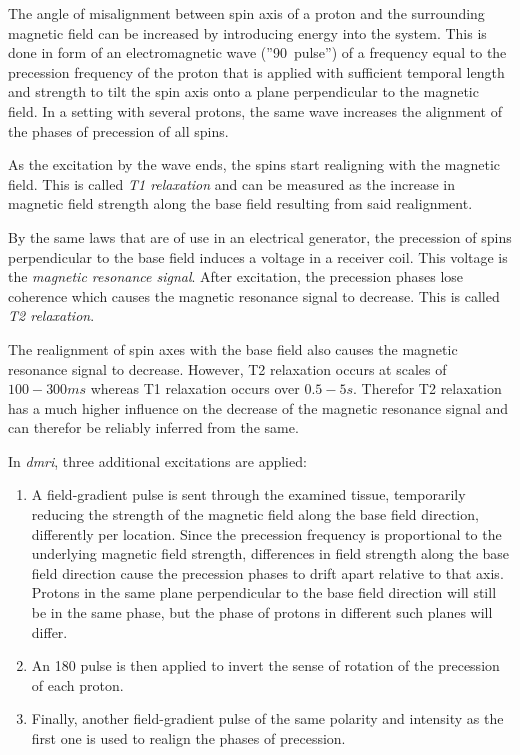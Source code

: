 \documentclass[plainreport]{cgvpub}
\begin{document}
	The angle of misalignment between spin axis of a proton and the surrounding magnetic field can be increased by introducing energy into the system. This is done in form of an electromagnetic wave \mbox{(''90\textdegree{} pulse'')} of a frequency equal to the precession frequency of the proton that is applied with sufficient temporal length and strength to tilt the spin axis onto a plane perpendicular to the magnetic field.  In a setting with several protons, the same wave increases the alignment of the phases of precession of all spins.
	
	As the excitation by the wave ends, the spins start realigning with the magnetic field. This is called \emph{T1 relaxation} and can be measured as the increase in magnetic field strength along the base  field resulting from said realignment. 
	
	By the same laws that are of use in an electrical generator, the precession of spins perpendicular to the base field induces a voltage in a receiver coil. This voltage is the \emph{magnetic resonance signal}. After excitation, the precession phases lose coherence which causes the magnetic resonance signal to decrease. This is called \emph{T2 relaxation}.
	
	The realignment of spin axes with the base field also causes the magnetic resonance signal to decrease. However, T2 relaxation occurs at scales of $ 100-300ms $ whereas T1 relaxation occurs over $ 0.5 - 5s $. Therefor T2 relaxation has a much higher influence on the decrease of the magnetic resonance signal and can therefor be reliably inferred from the same. 
	
	In \emph{\acrfull{dmri}}, three additional excitations are applied:
	\begin{enumerate}
		\item A field-gradient pulse is sent through the examined tissue, temporarily reducing the strength of the magnetic field along the base field direction, differently per location. Since the precession frequency is proportional to the underlying magnetic field strength, differences in field strength along the base field direction cause the precession phases to drift apart relative to that axis. Protons in the same plane perpendicular to the base field direction will still be in the same phase, but the phase of protons in different such planes will differ.
		\item An 180\textdegree{} pulse is then applied to invert the sense of rotation of the precession of each proton. 
		\item Finally, another field-gradient pulse of the same polarity and intensity as the first one is used to realign the phases of precession.
	\end{enumerate}
\end{document}
